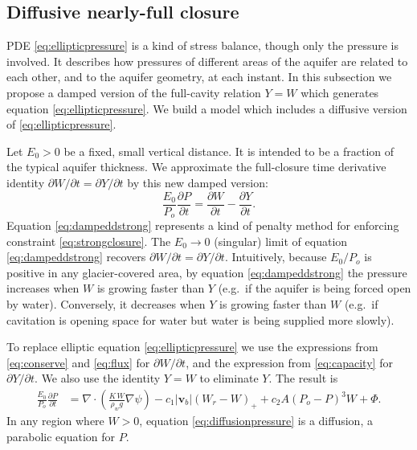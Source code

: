 \documentclass[11pt,final]{amsart}%
\newcommand\bv{\mathbf{v}}
\newcommand{\Div}{\nabla\cdot}
\newcommand{\grad}{\nabla}
\begin{document}
\subsection*{Diffusive nearly-full closure}  PDE \eqref{eq:ellipticpressure} is a kind of stress balance, though only the pressure is involved.  It describes how pressures of different areas of the aquifer are related to each other, and to the aquifer geometry, at each instant.  In this subsection we propose a damped version of the full-cavity relation $Y=W$ which generates equation \eqref{eq:ellipticpressure}.  We build a model which includes a diffusive version of \eqref{eq:ellipticpressure}.

Let $E_0>0$ be a fixed, small vertical distance.  It is intended to be a fraction of the typical aquifer thickness.  We approximate the full-closure time derivative identity $\partial W/\partial t = \partial Y/\partial t$ by this new damped version:
\begin{equation}
\frac{E_0}{P_o} \frac{\partial P}{\partial t} =  \frac{\partial W}{\partial t}  - \frac{\partial Y}{\partial t}.\label{eq:dampeddstrong}
\end{equation}
Equation \eqref{eq:dampeddstrong} represents a kind of penalty method for enforcing constraint \eqref{eq:strongclosure}.  The $E_0\to 0$ (singular) limit of equation \eqref{eq:dampeddstrong} recovers $\partial W/\partial t = \partial Y/\partial t$.  Intuitively, because $E_0/P_o$ is positive in any glacier-covered area, by equation \eqref{eq:dampeddstrong} the pressure increases when $W$ is growing faster than $Y$ (e.g.~if the aquifer is being forced open by water).  Conversely, it decreases when $Y$ is growing faster than $W$ (e.g.~if cavitation is opening space for water but water is being supplied more slowly).

To replace elliptic equation \eqref{eq:ellipticpressure} we use the expressions from \eqref{eq:conserve} and \eqref{eq:flux} for $\partial W/\partial t$, and the expression from \eqref{eq:capacity} for $\partial Y/\partial t$.  We also use the identity $Y=W$ to eliminate $Y$.  The result is
\begin{align}
\frac{E_0}{P_o} \frac{\partial P}{\partial t} &= \Div \left(\frac{K\,W}{\rho_w g} \grad \psi\right) - c_1 |\bv_b| (W_r - W)_+  + c_2 A (P_o - P)^3 W  + \Phi. \label{eq:diffusionpressure}
\end{align}
In any region where $W>0$, equation \eqref{eq:diffusionpressure} is a diffusion, a parabolic equation for $P$.
\end{document}
